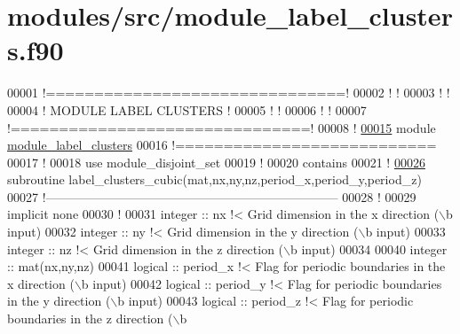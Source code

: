 \hypertarget{module__label__clusters_8f90_source}{
\section{modules/src/module\-\_\-label\-\_\-clusters.f90}
}

\begin{DoxyCode}
00001 \textcolor{comment}{!===============================!}
00002 \textcolor{comment}{!                               !}
00003 \textcolor{comment}{!                               !}
00004 \textcolor{comment}{!     MODULE LABEL CLUSTERS     !}
00005 \textcolor{comment}{!                               !}
00006 \textcolor{comment}{!                               !}
00007 \textcolor{comment}{!===============================!}
00008 \textcolor{comment}{!}
\hypertarget{module__label__clusters_8f90_source_l00015}{}\hyperlink{classmodule__label__clusters}{00015} \textcolor{keyword}{module} \hyperlink{classmodule__label__clusters}{module_label_clusters}
00016 \textcolor{comment}{!===========================}
00017   \textcolor{comment}{!}
00018   use \textcolor{keywordflow}{module\_disjoint\_set} 
00019   \textcolor{comment}{!}
00020 \textcolor{keyword}{contains}
00021   \textcolor{comment}{!}
\hypertarget{module__label__clusters_8f90_source_l00026}{}\hyperlink{classmodule__label__clusters_ac59dcadecc65ca2548221f9ea7858382}{00026}   \textcolor{keyword}{subroutine }label\_clusters\_cubic(mat,nx,ny,nz,period\_x,period\_y,period\_z)
00027   \textcolor{comment}{!-----------------------------------------------------------------------}
00028     \textcolor{comment}{!}
00029     \textcolor{keyword}{implicit none}
00030     \textcolor{comment}{!}
00031     \textcolor{keywordtype}{integer} :: nx \textcolor{comment}{!< Grid dimension in the x direction (\(\backslash\)b input)}
00032     \textcolor{keywordtype}{integer} :: ny \textcolor{comment}{!< Grid dimension in the y direction (\(\backslash\)b input)}
00033     \textcolor{keywordtype}{integer} :: nz \textcolor{comment}{!< Grid dimension in the z direction (\(\backslash\)b input)}
00034 
00040     \textcolor{keywordtype}{integer} :: mat(nx,ny,nz) 
00041     \textcolor{keywordtype}{logical} :: period\_x \textcolor{comment}{!< Flag for periodic boundaries in the x direction (\(\backslash\)b
       input)}
00042     \textcolor{keywordtype}{logical} :: period\_y \textcolor{comment}{!< Flag for periodic boundaries in the y direction (\(\backslash\)b
       input)}
00043     \textcolor{keywordtype}{logical} :: period\_z \textcolor{comment}{!< Flag for periodic boundaries in the z direction (\(\backslash\)b
}
\end{DoxyCode}
